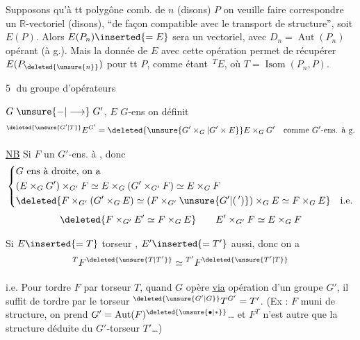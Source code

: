 Supposons qu'à tt polygône comb. de  $n$ (disons) $P$ on veuille faire correspondre un $\mathbb{R}$-vectoriel  (disons), ``de façon compatible avec le transport de structure'',  soit $E(P)$. Alors $E(P_n)\inserted{=E}$ sera un vectoriel, avec $D_n=\operatorname{Aut}(P_n)$ opérant (à g.). Mais la donnée de $E$ avec cette opération permet de récupérer $E(P_{\deleted{\unsure{n}}})$ pour tt $P$, comme étant  $\,{}^TE$, où $T=\operatorname{Isom}(P_n,P)$.

\textcircled{5}  du groupe d'opérateurs

$G\mathrel{\unsure{-|\longrightarrow}}G'$, $E$ $G$-ens \unsure{,} on définit
\[
 {}^{\deleted{\unsure{G'|T}}}E^{G'}=\deleted{\unsure{G'\times_G|G'\times E}}E\times_G G'
 \quad\text{comme $G'$-ens. à g.}
\]

\uline{NB} Si $F$ un $G'$-ens. à , donc
\[
\left\{\begin{aligned}
 &G\text{ ens à droite, on a}\\
 &(E\times_G G')\times_{G'}F\simeq E\times_G(G'\times_{G'}F)\simeq E\times_G F\\
 &\deleted{F\times_{G'}(G'\times_G E)\simeq(F\times_{G'}\unsure{G'|(\,')})\times_G E\simeq F\times_G E}\quad\text{i.e.}
\end{aligned}\right.
\]
\[
 \deleted{F\times_{G'}E'\simeq F\times_G E}\qquad E'\times_{G'}F\simeq E\times_G F
\]

Si $E\inserted{=T}$ torseur , $E'\inserted{=T'}$ aussi, donc on a
\[
 {}^{T}F^{\deleted{\unsure{T|T'}}}\simeq{}^{T'}F^{\deleted{\unsure{T'|T}}}
\]

i.e. Pour tordre $F$ par torseur $T$, quand $G$ opère
\uline{via} opération d'un groupe $G'$, il suffit de tordre par le torseur ${}^{\deleted{\unsure{G'|G}}}T^{G'}=T'$. (Ex :  $F$ muni de  structure,  on prend $G'=\operatorname{Aut}(F)^{\deleted{\unsure{\bullet|\ast}}}$\ldots{} et $F^T$ n'est autre  que la structure déduite du $G'$-torseur $T'$\ldots)

